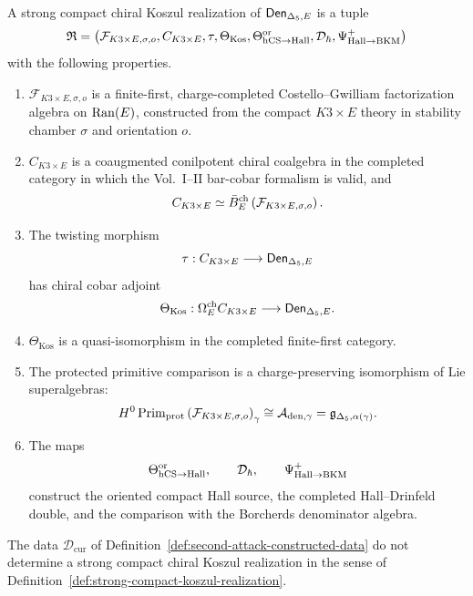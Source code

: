 \begin{definition}
\label{def:strong-compact-koszul-realization}
A strong compact chiral Koszul realization of
\(\mathsf{Den}_{\Delta_5,E}\) is a tuple
$$
\mathfrak R=
\left(
\mathcal F_{K3\times E,\sigma,o},
C_{K3\times E},
\tau,
\Theta_{\mathrm{Kos}},
\Theta_{\mathrm{hCS}\to\mathrm{Hall}}^{\mathrm{or}},
\mathcal D_\hbar,
\Psi^+_{\mathrm{Hall}\to\mathrm{BKM}}
\right)
$$
with the following properties.
\begin{enumerate}
\item \(\mathcal F_{K3\times E,\sigma,o}\) is a finite-first,
charge-completed Costello--Gwilliam factorization algebra on
\(\operatorname{Ran}(E)\), constructed from the compact \(K3\times E\) theory in
stability chamber \(\sigma\) and orientation \(o\).
\item \(C_{K3\times E}\) is a coaugmented conilpotent chiral coalgebra in
the completed category in which the Vol.~I--II bar-cobar formalism is
valid, and
$$
C_{K3\times E}\simeq
\bar B^{\mathrm{ch}}_E
\left(\mathcal F_{K3\times E,\sigma,o}\right).
$$
\item The twisting morphism
$$
\tau:C_{K3\times E}\longrightarrow
\mathsf{Den}_{\Delta_5,E}
$$
has chiral cobar adjoint
$$
\Theta_{\mathrm{Kos}}:
\Omega^{\mathrm{ch}}_E C_{K3\times E}
\longrightarrow
\mathsf{Den}_{\Delta_5,E}.
$$
\item \(\Theta_{\mathrm{Kos}}\) is a quasi-isomorphism in the completed
finite-first category.
\item The protected primitive comparison is a charge-preserving
isomorphism of Lie superalgebras:
$$
H^0\operatorname{Prim}_{\mathrm{prot}}
\left(\mathcal F_{K3\times E,\sigma,o}\right)_\gamma
\cong
\mathcal A_{\mathrm{den},\gamma}
=\mathfrak g_{\Delta_5,\alpha(\gamma)}.
$$
\item The maps
$$
\Theta_{\mathrm{hCS}\to\mathrm{Hall}}^{\mathrm{or}},\qquad
\mathcal D_\hbar,\qquad
\Psi^+_{\mathrm{Hall}\to\mathrm{BKM}}
$$
construct the oriented compact Hall source, the completed
Hall--Drinfeld double, and the comparison with the Borcherds
denominator algebra.
\end{enumerate}
\end{definition}

\begin{theorem}
\label{thm:no-promotion-from-current-data}
The data \(\mathcal D_{\mathrm{cur}}\) of
Definition~\ref{def:second-attack-constructed-data} do not determine a
strong compact chiral Koszul realization in the sense of
Definition~\ref{def:strong-compact-koszul-realization}.
\end{theorem}

